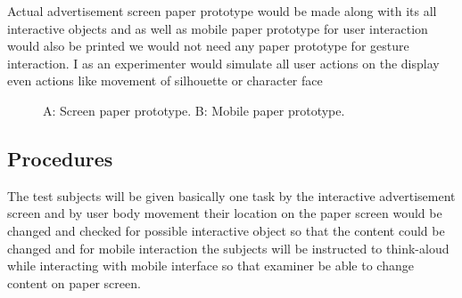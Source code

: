 Actual advertisement screen paper prototype would be made along with its all interactive objects and as well as mobile paper prototype for user interaction would also be printed we would not need any paper prototype for gesture interaction. I as an experimenter would simulate all user actions on the display even actions like movement of silhouette or character face


\begin{figure}[H]
    \centering
    \hfill
    \caption{A: Screen paper prototype. B: Mobile paper prototype. }%
    \label{fig:paper_prototype}%
\end{figure}





\subsection{Procedures}

The test subjects will be given basically one task by the interactive advertisement screen and by user body movement their location on the paper screen would be changed and checked for possible interactive object so that the content could be changed and for mobile interaction the subjects will be instructed to think-aloud while interacting with mobile interface so that examiner be able to change content on paper screen.

